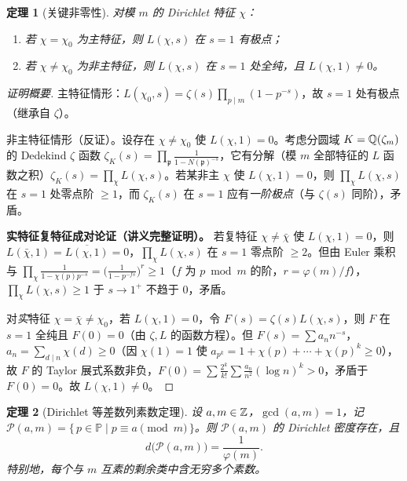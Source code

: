 \documentclass{article}
\newcommand{\Prim}{\mathbb{P}}
\theoremstyle{plain}
\newtheorem{thm}{定理}[section]
\theoremstyle{definition}
\theoremstyle{remark}
\begin{document}
\begin{thm}[关键非零性]\label{thm:L-nonzero}
  对模 $m$ 的 Dirichlet 特征 $\chi$：
  \begin{enumerate}[(1)]
    \item 若 $\chi=\chi_0$ 为主特征，则 $L(\chi,s)$ 在 $s=1$ 有极点；
    \item 若 $\chi\ne\chi_0$ 为非主特征，则 $L(\chi,s)$ 在 $s=1$ 处全纯，且 $L(\chi,1)\ne0$。
  \end{enumerate}
\end{thm}

\begin{proof}[证明概要]
  主特征情形：$L(\chi_0,s)=\zeta(s)\prod_{p\mid m}(1-p^{-s})$，故 $s=1$ 处有极点（继承自 $\zeta$）。

  非主特征情形（反证）。设存在 $\chi\ne\chi_0$ 使 $L(\chi,1)=0$。考虑分圆域 $K=\mathbb{Q}(\zeta_m)$ 的 Dedekind $\zeta$ 函数 $\zeta_K(s)=\prod_{\mathfrak p}\frac1{1-N(\mathfrak p)^{-s}}$，它有分解（模 $m$ 全部特征的 $L$ 函数之积）$\zeta_K(s)=\prod_\chi L(\chi,s)$。若某非主 $\chi$ 使 $L(\chi,1)=0$，则 $\prod_\chi L(\chi,s)$ 在 $s=1$ 处零点阶 $\ge1$，而 $\zeta_K(s)$ 在 $s=1$ 应有\emph{一阶极点}（与 $\zeta(s)$ 同阶），矛盾。

  \textbf{实特征复特征成对论证（讲义完整证明）。} 若复特征 $\chi\ne\bar\chi$ 使 $L(\chi,1)=0$，则 $L(\bar\chi,1)=\overline{L(\chi,1)}=0$，$\prod_\chi L(\chi,s)$ 在 $s=1$ 零点阶 $\ge2$。但由 Euler 乘积与 $\prod_\chi\frac1{1-\chi(p)p^{-s}}=\bigl(\frac1{1-p^{-fs}}\bigr)^r\ge1$（$f$ 为 $p\bmod m$ 的阶，$r=\varphi(m)/f$），$\prod_\chi L(\chi,s)\ge1$ 于 $s\to1^+$ 不趋于 $0$，矛盾。

  对\emph{实}特征 $\chi=\bar\chi\ne\chi_0$，若 $L(\chi,1)=0$，令 $F(s)=\zeta(s)L(\chi,s)$，则 $F$ 在 $s=1$ 全纯且 $F(0)=0$（由 $\zeta,L$ 的函数方程）。但 $F(s)=\sum a_nn^{-s}$，$a_n=\sum_{d\mid n}\chi(d)\ge0$（因 $\chi(1)=1$ 使 $a_{p^k}=1+\chi(p)+\cdots+\chi(p)^k\ge0$），故 $F$ 的 Taylor 展式系数非负，$F(0)=\sum\frac{2^k}{k!}\sum\frac{a_n}{n^2}(\log n)^k>0$，矛盾于 $F(0)=0$。故 $L(\chi,1)\ne0$。
\end{proof}

\begin{thm}[Dirichlet 等差数列素数定理]\label{thm:dirichlet}
  设 $a,m\in\mathbb{Z}$，$\gcd(a,m)=1$，记 $\mathcal P(a,m)=\{\,p\in\Prim\mid p\equiv a\pmod m\,\}$。则 $\mathcal P(a,m)$ 的 Dirichlet 密度存在，且
  \[
    d\bigl(\mathcal P(a,m)\bigr)=\frac1{\varphi(m)}.
  \]
  特别地，每个与 $m$ 互素的剩余类中含无穷多个素数。
\end{thm}
\end{document}

